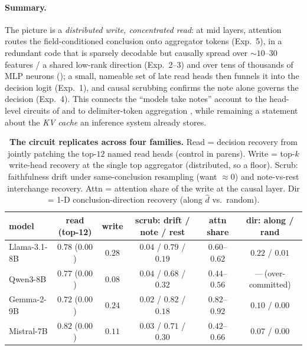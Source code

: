 \paragraph{Summary.} The picture is a \emph{distributed write, concentrated read}: at mid layers,
attention routes the field-conditioned conclusion onto aggregator tokens (Exp.\ 5), in a redundant code that is
sparsely decodable but causally spread over ${\sim}10$--$30$ features / a shared low-rank direction (Exp.\
2--3) and over tens of thousands of MLP neurons (); a small, nameable set of late read heads then funnels it into the decision logit (Exp.\ 1), and
causal scrubbing confirms the note alone governs the decision (Exp.\ 4). This connects the
``models take notes'' account to the head-level circuits of \citet{wang2023ioi} and to delimiter-token
aggregation \citep{lindsey2025biology}, while remaining a statement about the \emph{KV cache} an inference
system already stores.

\begin{table}[tbp]
\centering\small
\caption{\textbf{The circuit replicates across four families.} Read = decision recovery from jointly
patching the top-$12$ named read heads (control in parens). Write = top-$k$ write-head recovery at the single
top aggregator (distributed, so a floor). Scrub: faithfulness drift under same-conclusion resampling
(want ${\approx}0$) and note-vs-rest interchange recovery. Attn = attention share of the write at the causal
layer. Dir = 1-D conclusion-direction recovery (along $\hat d$ vs.\ random).}
\label{tab:circuit}
\begin{tabular}{lccccc}
\toprule
model & read (top-12) & write & scrub: drift / note / rest & attn share & dir: along / rand \\
\midrule
Llama-3.1-8B & $0.78$ ($0.00$) & $0.28$ & $0.04$ / $0.79$ / $0.19$ & $0.60$--$0.62$ & $0.22$ / $0.01$ \\
Qwen3-8B     & $0.77$ ($0.00$) & $0.08$ & $0.04$ / $0.68$ / $0.32$ & $0.44$--$0.56$ & ---\,(over-committed) \\
Gemma-2-9B   & $0.72$ ($0.00$) & $0.24$ & $0.02$ / $0.82$ / $0.18$ & $0.82$--$0.92$ & $0.10$ / $0.00$ \\
Mistral-7B   & $0.82$ ($0.00$) & $0.11$ & $0.03$ / $0.71$ / $0.30$ & $0.42$--$0.66$ & $0.07$ / $0.00$ \\
\bottomrule
\end{tabular}
\end{table}

